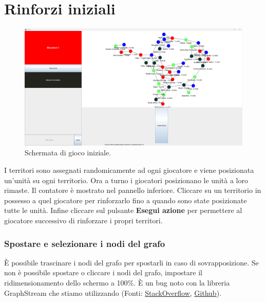 \documentclass[a4paper,12pt]{report}
\begin{document}
\section{Rinforzi iniziali}
\begin{figure}[H]
	\centering
	\includegraphics[width=1\textwidth]{user_guide/4_initial_reinforcements.png}
	\caption{Schermata di gioco iniziale.}
\end{figure}
I territori sono assegnati randomicamente ad ogni giocatore e viene posizionata un'unità su ogni territorio.
Ora a turno i giocatori posizionano le unità a loro rimaste. Il contatore è mostrato nel pannello inferiore. Cliccare su un territorio in possesso a quel giocatore per rinforzarlo fino a quando sono state posizionate tutte le unità. Infine cliccare sul pulsante \textbf{Esegui azione} per permettere al giocatore successivo di rinforzare i propri territori.

\subsubsection{Spostare e selezionare i nodi del grafo}
È possibile trascinare i nodi del grafo per spostarli in caso di sovrapposizione.
Se non è possibile spostare o cliccare i nodi del grafo, impostare il ridimensionamento dello schermo a 100\%. È un bug noto con la libreria GraphStream che stiamo utilizzando (Fonti: \href{https://stackoverflow.com/questions/74860061/graphstream-2-0-mouse-pointer-offset-when-dragging-nodes-not-solved}{StackOverflow}, \href{https://github.com/graphstream/gs-core/issues/301}{Github}).
\end{document}
